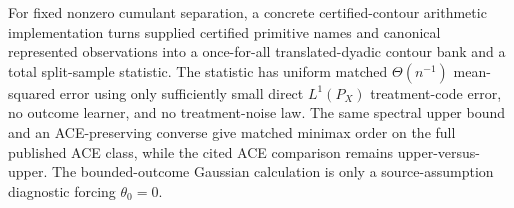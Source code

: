 For fixed nonzero cumulant separation, a concrete certified-contour arithmetic implementation turns supplied certified primitive names and canonical represented observations into a once-for-all translated-dyadic contour bank and a total split-sample statistic.  The statistic has uniform matched \(\Theta(n^{-1})\) mean-squared error using only sufficiently small direct \(L^1(P_X)\) treatment-code error, no outcome learner, and no treatment-noise law.  The same spectral upper bound and an ACE-preserving converse give matched minimax order on the full published ACE class, while the cited ACE comparison remains upper-versus-upper.  The bounded-outcome Gaussian calculation is only a source-assumption diagnostic forcing \(\theta_0=0\).
